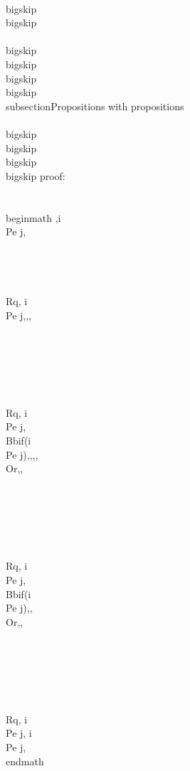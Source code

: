 \\bigskip
\\bigskip
\\[,i \\nPe j, \\Bb{if(i \\Pe j)}{,\\Tc c_1,}{,\\Tc c_2,}, \\Rq , i \\nPe j, \\Tc c_2,\\]
\\bigskip
\\bigskip
\\bigskip
\\bigskip
\\subsection{Propositions with propositions}
\\[,i \\Pe j, \\Rq , i \\Pe j, i \\Pe j,\\]

\\bigskip
\\bigskip
\\bigskip
\\bigskip
proof:\\\\
\\begin{math} 
,i \\Pe j,\\\\\\\\
\\Rq, i \\Pe j,,, \\\\\\\\\\\\
\\Rq, i \\Pe j, \\Bb{if(i \\Pe j)}{,,,}{, \\Or,}, \\\\\\\\\\\\
\\Rq, i \\Pe j, \\Bb{if(i \\Pe j)}{,}{, \\Or,}, \\\\\\\\\\\\
\\Rq, i \\Pe j, i \\Pe j,
\\end{math}


